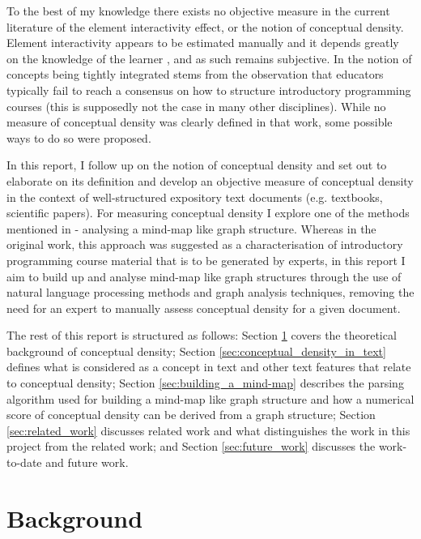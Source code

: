 \documentclass[12pt]{article}
\theoremstyle{grammarstyle}
\begin{document}
To the best of my knowledge there exists no objective measure in the current literature of the element interactivity effect, or the notion of conceptual density. Element interactivity appears to be estimated manually and it depends greatly on the knowledge of the learner \citep{chandler1996cognitive}, and as such remains subjective. In \citep{robins2010learning} the notion of concepts being tightly integrated stems from the observation that educators typically fail to reach a consensus on how to structure introductory programming courses (this is supposedly not the case in many other disciplines).  While no measure of conceptual density was clearly defined in that work, some possible ways to do so were proposed.

In this report,  I follow up on the notion of conceptual density and set out to elaborate on its definition and develop an objective measure of conceptual density in the context of well-structured expository text documents (e.g. textbooks, scientific papers). For measuring conceptual density I explore one of the methods mentioned in \citep{robins2010learning} - analysing a mind-map like graph structure. Whereas in the original work, this approach was suggested as a characterisation of introductory programming course material that is to be generated by experts, in this report I aim to build up and analyse mind-map like graph structures through the use of natural language processing methods and graph analysis techniques, removing the need for an expert to manually assess conceptual density for a given document.

The rest of this report is structured as follows: Section \ref{sec:background} covers the theoretical background of conceptual density; Section \ref{sec:conceptual_density_in_text} defines what is considered as a concept in text and other text features that relate to conceptual density; Section \ref{sec:building_a_mind-map} describes the parsing algorithm used for building a mind-map like graph structure and how a numerical score of conceptual density can be derived from a graph structure; Section \ref{sec:related_work} discusses related work and what distinguishes the work in this project from the related work; and Section \ref{sec:future_work} discusses the work-to-date and future work.

\section{Background} \label{sec:background}
\end{document}
